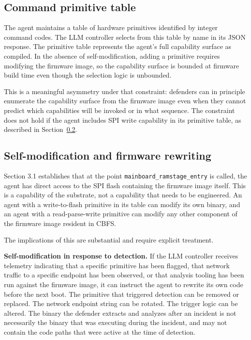 \documentclass[11pt,a4paper]{article}
\begin{document}
\subsection{Command primitive table}

The agent maintains a table of hardware primitives identified by integer command codes. The LLM controller selects from this table by name in its JSON response. The primitive table represents the agent's full capability surface as compiled. In the absence of self-modification, adding a primitive requires modifying the firmware image, so the capability surface is bounded at firmware build time even though the selection logic is unbounded.

This is a meaningful asymmetry under that constraint: defenders can in principle enumerate the capability surface from the firmware image even when they cannot predict which capabilities will be invoked or in what sequence. The constraint does not hold if the agent includes SPI write capability in its primitive table, as described in Section~\ref{sec:selfmod}.

\subsection{Self-modification and firmware rewriting}
\label{sec:selfmod}

Section 3.1 establishes that at the point \texttt{mainboard\_ramstage\_entry} is called, the agent has direct access to the SPI flash containing the firmware image itself. This is a capability of the substrate, not a capability that needs to be engineered. An agent with a write-to-flash primitive in its table can modify its own binary, and an agent with a read-parse-write primitive can modify any other component of the firmware image resident in CBFS.

The implications of this are substantial and require explicit treatment.

\textbf{Self-modification in response to detection.} If the LLM controller receives telemetry indicating that a specific primitive has been flagged, that network traffic to a specific endpoint has been observed, or that analysis tooling has been run against the firmware image, it can instruct the agent to rewrite its own code before the next boot. The primitive that triggered detection can be removed or replaced. The network endpoint string can be rotated. The trigger logic can be altered. The binary the defender extracts and analyzes after an incident is not necessarily the binary that was executing during the incident, and may not contain the code paths that were active at the time of detection.
\end{document}
